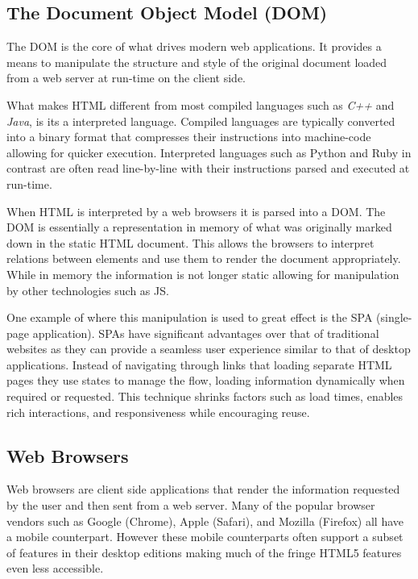 \documentclass[final]{cmpreport}
\begin{document}

\subsection{The Document Object Model (DOM)}
The DOM is the core of what drives modern web applications. It provides a means to manipulate the structure and style of the original document loaded from a web server at run-time on the client side.

What makes HTML different from most compiled languages such as \textit{C++} and \textit{Java}, is its a interpreted language. Compiled languages are typically converted into a binary format that compresses their instructions into machine-code allowing for quicker execution. Interpreted languages such as Python and Ruby in contrast are often read line-by-line with their instructions parsed and executed at run-time.

When HTML is interpreted by a web browsers it is parsed into a DOM. The DOM is essentially a representation in memory of what was originally marked down in the static HTML document. This allows the browsers to interpret relations between elements and use them to render the document appropriately. While in memory the information is not longer static allowing for manipulation by other technologies such as JS.

One example of where this manipulation is used to great effect is the SPA (single-page application). SPAs have significant advantages over that of traditional websites as they can provide a seamless user experience similar to that of desktop applications. Instead of navigating through links that loading separate HTML pages they use states to manage the flow, loading information dynamically when required or requested. This technique shrinks factors such as load times, enables rich interactions, and responsiveness while encouraging reuse. \citep{Takada}

\subsection{Web Browsers}
Web browsers are client side applications that render the information requested by the user and then sent from a web server. Many of the popular browser vendors such as Google (Chrome), Apple (Safari), and Mozilla (Firefox) all have a mobile counterpart. However these mobile counterparts often support a subset of features in their desktop editions making much of the fringe HTML5 features even less accessible.
\end{document}
